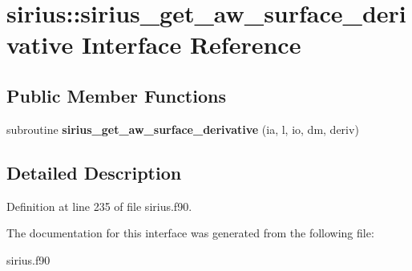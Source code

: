 \hypertarget{interfacesirius_1_1sirius__get__aw__surface__derivative}{}\section{sirius\+:\+:sirius\+\_\+get\+\_\+aw\+\_\+surface\+\_\+derivative Interface Reference}
\label{interfacesirius_1_1sirius__get__aw__surface__derivative}
\subsection*{Public Member Functions}
\begin{DoxyCompactItemize}
\item 
\hypertarget{interfacesirius_1_1sirius__get__aw__surface__derivative_a2923465a63ce83de646703e87e2d3b4c}{}subroutine {\bfseries sirius\+\_\+get\+\_\+aw\+\_\+surface\+\_\+derivative} (ia, l, io, dm, deriv)\label{interfacesirius_1_1sirius__get__aw__surface__derivative_a2923465a63ce83de646703e87e2d3b4c}

\end{DoxyCompactItemize}


\subsection{Detailed Description}


Definition at line 235 of file sirius.\+f90.



The documentation for this interface was generated from the following file\+:\begin{DoxyCompactItemize}
\item 
sirius.\+f90\end{DoxyCompactItemize}
